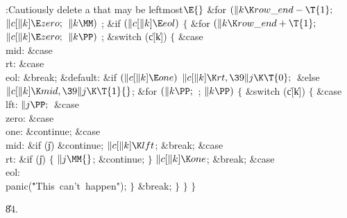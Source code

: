 \B{}:Cautiously delete a  that may be
leftmost\X${}\E{}$\6
\&{for} ${}(\|k\K\\{row\_end}-\T{1};{}$ ${}\|c[\|k]\E\\{zero};{}$ ${}\|k\MM){}$%
\1\5
;\2\6
\&{if} ${}(\|c[\|k]\E\\{eol}){}$\5
${}\{{}$\1\6
\&{for} ${}(\|k\K\\{row\_end}+\T{1};{}$ ${}\|c[\|k]\E\\{zero};{}$ ${}\|k\PP){}$%
\1\5
;\2\6
\&{switch} (\|c[\|k])\5
${}\{{}$\1\6
\4\&{case} \\{mid}:\5
\&{case} \\{rt}:\5
\&{case} \\{eol}:\5
\&{break};\6
\4\&{default}:\5
\&{if} ${}(\|c[\|k]\E\\{one}){}$\1\5
${}\|c[\|k]\K\\{rt},\39\|j\K\T{0};{}$\2\6
\&{else}\1\5
${}\|c[\|k]\K\\{mid},\39\|j\K\T{1}{}$;\2\6
\&{for} ${}(\|k\PP;{}$  ; ${}\|k\PP){}$\5
${}\{{}$\1\6
\&{switch} (\|c[\|k])\5
${}\{{}$\1\6
\4\&{case} \\{lft}:\5
${}\|j\PP;{}$\6
\4\&{case} \\{zero}:\5
\&{case} \\{one}:\5
\&{continue};\6
\4\&{case} \\{mid}:\5
\&{if} (\|j)\1\5
\&{continue};\2\6
${}\|c[\|k]\K\\{lft}{}$;\5
\&{break};\6
\4\&{case} \\{rt}:\5
\&{if} (\|j)\5
${}\{{}$\5
\1${}\|j\MM{}$;\5
\&{continue};\5
${}\}{}$\2\6
${}\|c[\|k]\K\\{one}{}$;\5
\&{break};\6
\4\&{case} \\{eol}:\5
\\{panic}(\.{"This\ can't\ happen"});\6
\4${}\}{}$\2\6
\&{break};\6
\4${}\}{}$\2\6
\4${}\}{}$\2\6
\4${}\}{}$\2\par
\U84.\fi

